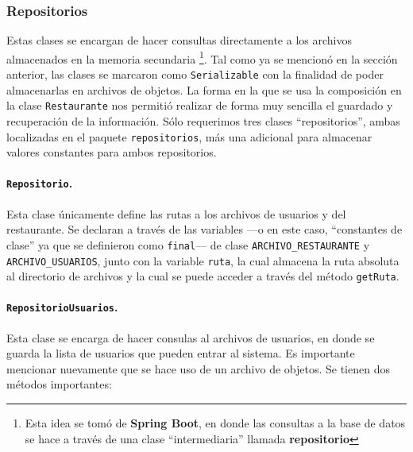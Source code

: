 \pagebreak

\subsubsection*{Repositorios}

Estas clases se encargan de hacer consultas directamente a los archivos almacenados en la memoria 
secundaria \footnote{Esta idea se tomó de \textbf{Spring Boot}, en donde las consultas a la base de datos se 
hace a través de una clase ``intermediaria'' llamada \textbf{repositorio}}. Tal como ya se mencionó 
en la sección anterior, las clases se marcaron como \texttt{Serializable} con la finalidad de poder 
almacenarlas en archivos de objetos. La forma en la que se usa la composición en la clase 
\texttt{Restaurante} nos permitió realizar de forma muy sencilla el guardado y recuperación de la 
información. Sólo requerimos tres clases ``repositorios'', ambas localizadas en el paquete 
\texttt{repositorios}, más una adicional para almacenar valores constantes para ambos repositorios.

\paragraph{\texttt{Repositorio}.} Esta clase únicamente define las rutas a los archivos de usuarios
y del restaurante. Se declaran a través de las variables ---o en este caso, ``constantes de clase'' ya 
que se definieron como \texttt{final}--- de clase \texttt{ARCHIVO\_RESTAURANTE} y 
\texttt{ARCHIVO\_USUARIOS}, junto con la variable \texttt{ruta}, la cual almacena la ruta absoluta 
al directorio de archivos y la cual se puede acceder a través del método \texttt{getRuta}.

\paragraph{\texttt{RepositorioUsuarios}.} Esta clase se encarga de hacer consulas al archivos de
usuarios, en donde se guarda la lista de usuarios que pueden entrar al sistema. Es importante mencionar
nuevamente que se hace uso de un archivo de objetos. Se tienen dos métodos importantes:

